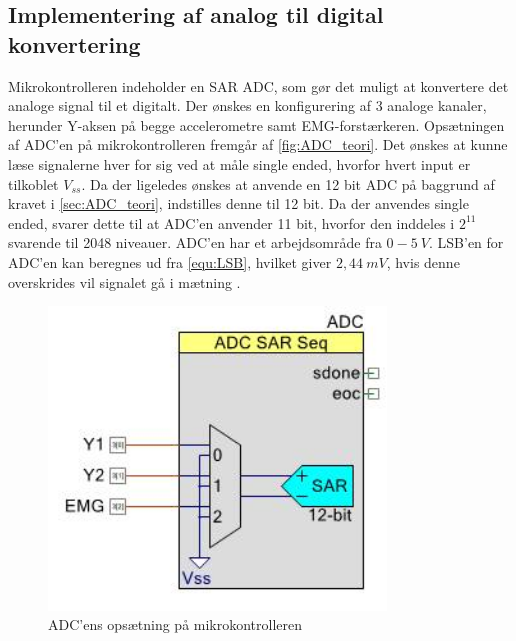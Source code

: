 \subsection{Implementering af analog til digital konvertering}
Mikrokontrolleren indeholder en SAR ADC, som gør det muligt at konvertere det analoge signal til et digitalt. Der ønskes en konfigurering af 3 analoge kanaler, herunder Y-aksen på begge accelerometre samt EMG-forstærkeren. Opsætningen af ADC'en på mikrokontrolleren fremgår af \autoref{fig:ADC_teori}. Det ønskes at kunne læse signalerne hver for sig ved at måle single ended, hvorfor hvert input er tilkoblet $V_{ss}$. Da der ligeledes ønskes at anvende en 12 bit ADC på baggrund af kravet i \autoref{sec:ADC_teori}, indstilles denne til 12 bit. Da der anvendes single ended, svarer dette til at ADC'en anvender 11 bit, hvorfor den inddeles i $2^{11}$ svarende til 2048 niveauer. ADC'en har et arbejdsområde fra $0-5~V$. LSB'en for ADC'en kan beregnes ud fra \autoref{equ:LSB}, hvilket giver $2,44~mV$, hvis denne overskrides vil signalet gå i mætning \citep{ADC2014}. 

\begin{figure}[H]
\centering
\includegraphics[width=0.8\textwidth]{figures/implementering/ADC_imp.jpeg}
\caption{ADC'ens opsætning på mikrokontrolleren}
\label{fig:ADC_teori}
\end{figure}

